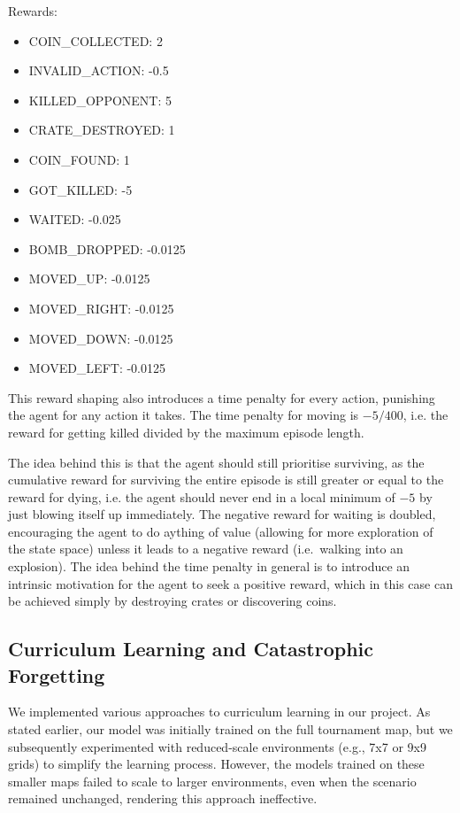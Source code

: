 \documentclass{article} %
\begin{document}
	Rewards:
	\begin{itemize}
		\item COIN\_COLLECTED: 2
		\item INVALID\_ACTION: -0.5
		\item KILLED\_OPPONENT: 5
		\item CRATE\_DESTROYED: 1
		\item COIN\_FOUND: 1
		\item GOT\_KILLED: -5
		\item WAITED: -0.025
		\item BOMB\_DROPPED: -0.0125
		\item MOVED\_UP: -0.0125
		\item MOVED\_RIGHT: -0.0125
		\item MOVED\_DOWN: -0.0125
		\item MOVED\_LEFT: -0.0125
	\end{itemize}
	
	This reward shaping also introduces a time penalty for every action, punishing the agent for any action it takes. The time penalty for moving is $-5/400$, i.e. the reward for getting killed divided by the maximum episode length.
	
	The idea behind this is that the agent should still prioritise surviving, as the cumulative reward for surviving the entire episode is still greater or equal to the reward for dying, i.e. the agent should never end in a local minimum of $-5$ by just blowing itself up immediately. 
	The negative reward for waiting is doubled, encouraging the agent to do aything of value (allowing for more exploration of the state space) unless it leads to a negative reward (i.e.\ walking into an explosion).
	The idea behind the time penalty in general is to introduce an intrinsic motivation for the agent to seek a positive reward, which in this case can be achieved simply by destroying crates or discovering coins.
	
	\subsection{Curriculum Learning and Catastrophic Forgetting}
	We implemented various approaches to curriculum learning in our project. As stated earlier, our model was initially trained on the full tournament map, but we subsequently experimented with reduced-scale environments (e.g., 7x7 or 9x9 grids) to simplify the learning process. However, the models trained on these smaller maps failed to scale to larger environments, even when the scenario remained unchanged, rendering this approach ineffective.
	
\end{document}
